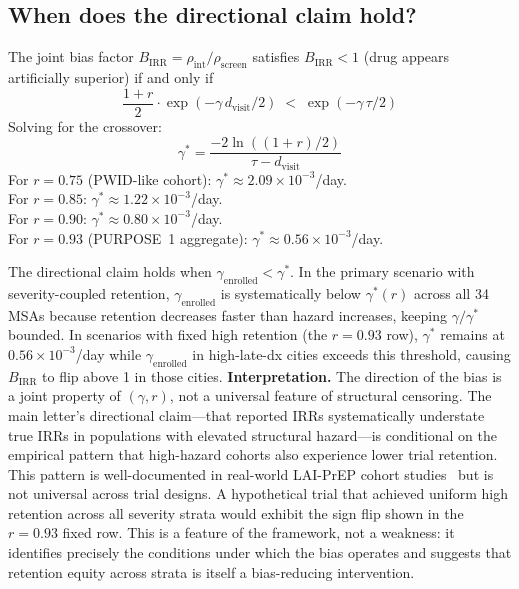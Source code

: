 \documentclass[11pt]{article}
\begin{document}
\subsection{When does the directional claim hold?}\label{sec:directional}

The joint bias factor $B_{\mathrm{IRR}} = \rho_{\mathrm{int}}/\rho_{\mathrm{screen}}$ satisfies $B_{\mathrm{IRR}} < 1$ (drug appears artificially superior) if and only if
\begin{equation}
\frac{1+r}{2} \cdot \exp(-\gamma\, d_{\mathrm{visit}}/2) \;<\; \exp(-\gamma\,\tau/2)
\end{equation}
Solving for the crossover:
\begin{equation}
\gamma^* = \frac{-2\ln((1+r)/2)}{\tau - d_{\mathrm{visit}}}
\end{equation}
For $r = 0.75$ (PWID-like cohort): $\gamma^* \approx 2.09 \times 10^{-3}$/day.\\
For $r = 0.85$: $\gamma^* \approx 1.22 \times 10^{-3}$/day.\\
For $r = 0.90$: $\gamma^* \approx 0.80 \times 10^{-3}$/day.\\
For $r = 0.93$ (PURPOSE~1 aggregate): $\gamma^* \approx 0.56 \times 10^{-3}$/day.

The directional claim holds when $\gamma_{\mathrm{enrolled}} < \gamma^*$. In the primary scenario with severity-coupled retention, $\gamma_{\mathrm{enrolled}}$ is systematically below $\gamma^*(r)$ across all 34 MSAs because retention decreases faster than hazard increases, keeping $\gamma/\gamma^*$ bounded. In scenarios with fixed high retention (the $r = 0.93$ row), $\gamma^*$ remains at $0.56 \times 10^{-3}$/day while $\gamma_{\mathrm{enrolled}}$ in high-late-dx cities exceeds this threshold, causing $B_{\mathrm{IRR}}$ to flip above 1 in those cities.
\textbf{Interpretation.} The direction of the bias is a joint property of $(\gamma, r)$, not a universal feature of structural censoring. The main letter's directional claim---that reported IRRs systematically understate true IRRs in populations with elevated structural hazard---is conditional on the empirical pattern that high-hazard cohorts also experience lower trial retention. This pattern is well-documented in real-world LAI-PrEP cohort studies~\cite{huang2024lai,coelho2024carolinas} but is not universal across trial designs. A hypothetical trial that achieved uniform high retention across all severity strata would exhibit the sign flip shown in the $r = 0.93$ fixed row. This is a feature of the framework, not a weakness: it identifies precisely the conditions under which the bias operates and suggests that retention equity across strata is itself a bias-reducing intervention.
\end{document}
